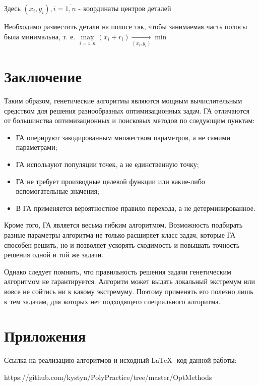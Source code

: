 Здесь ${(x_{i}, y_{i}),   i = \overline{1, n}}$ - координаты центров деталей

Необходимо разместить детали на полосе так, чтобы занимаемая часть полосы была минимальна, т. е. ${\max\limits_{i = \overline{1, n}}(x_{i} + r_{i})\xrightarrow[{(x_i, y_i)}]{} 
\min}$

\chapter{Заключение}
Таким образом, генетические алгоритмы являются мощным вычислительным средством для решения разнообразных оптимизационных задач. ГА отличаются от большинства оптимизационных и поисковых методов по следующим пунктам:
\begin{itemize}
	\item ГА оперируют закодированным множеством параметров, а не самими параметрами;
	\item ГА используют популяции точек, а не единственную точку;
	\item ГА не требует производные целевой функции или какие-либо вспомогательные значения;
	\item В ГА применяется вероятностное правило перехода, а не детерминированное.
\end{itemize}

Кроме того, ГА является весьма гибким алгоритмом. Возможность подбирать разные параметры алгоритма не только расширяет класс задач, которые ГА способен решить, но и позволяет ускорять сходимость и повышать точность решения одной и той же задачи.

Однако следует помнить, что правильность решения задачи генетическим алгоритмом не гарантируется. Алгоритм может выдать локальный экстремум или вовсе не сойтись ни к какому экстремуму. Поэтому применять его полезно лишь к тем задачам, для которых нет подходящего специального алгоритма.

\chapter*{Приложения}

Ссылка на реализацию алгоритмов и исходный \LaTeX - код данной работы: 

https://github.com/kystyn/PolyPractice/tree/master/OptMethods

\printbibliography
{}

